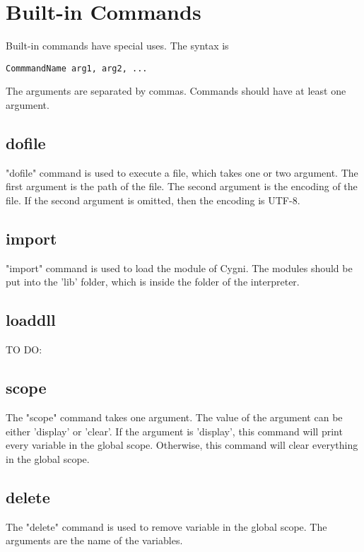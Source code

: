 \chapter{Built-in Commands}
Built-in commands have special uses. The syntax is

\begin{lstlisting}
CommmandName arg1, arg2, ...
\end{lstlisting}
The arguments are separated by commas. Commands should have at least one argument.
\section{dofile}
"dofile" command is used to execute a file, which takes one or two argument. The first argument is the path of the file. The second argument is the encoding of the file. If the second argument is omitted, then the encoding is UTF-8.
\section{import}
"import" command is used to load the module of Cygni. The modules should be put into the 'lib' folder, which is inside the folder of the interpreter.
\section{loaddll}
TO DO:
\section{scope}
The "scope" command takes one argument. The value of the argument can be either 'display' or 'clear'. If the argument is 'display', this command will print every variable in the global scope. Otherwise, this command will clear everything in the global scope.
\section{delete}
The "delete" command is used to remove variable in the global scope. The arguments are the name of the variables.
